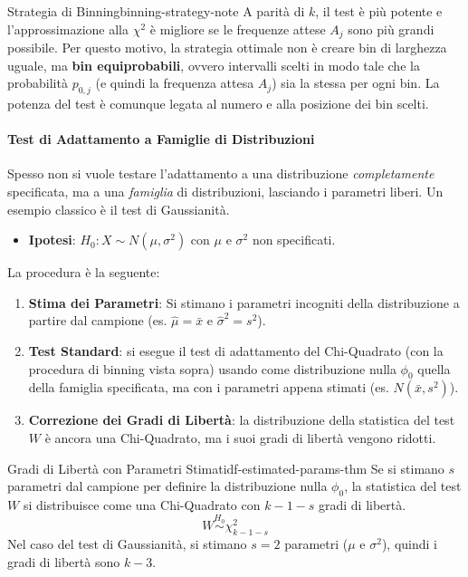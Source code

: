 \begin{nota}{Strategia di Binning}{binning-strategy-note}
A parità di \(k\), il test è più potente e l'approssimazione alla \(\chi^2\)
è migliore se le frequenze attese \(A_j\) sono più grandi possibile. Per
questo motivo, la strategia ottimale non è creare bin di larghezza uguale, ma
\textbf{bin equiprobabili}, ovvero intervalli scelti in modo tale che la
probabilità \(p_{0,j}\) (e quindi la frequenza attesa \(A_j\)) sia la stessa
per ogni bin. La potenza del test è comunque legata al numero e alla posizione
dei bin scelti.
\end{nota}

\paragraph{Test di Adattamento a Famiglie di Distribuzioni}
Spesso non si vuole testare l'adattamento a una distribuzione
\textit{completamente} specificata, ma a una \textit{famiglia} di distribuzioni,
lasciando i parametri liberi. Un esempio classico è il test di Gaussianità.
\begin{itemize}
    \item \textbf{Ipotesi}: \(H_0: X \sim N(\mu, \sigma^2)\) con \(\mu\) e
    \(\sigma^2\) non specificati.
\end{itemize}
La procedura è la seguente:
\begin{enumerate}
    \item \textbf{Stima dei Parametri}: Si stimano i parametri incogniti della
    distribuzione a partire dal campione (es. \(\hat{\mu} = \bar{x}\) e
    \(\hat{\sigma}^2 = s^2\)).
    \item \textbf{Test Standard}: si esegue il test di adattamento del
    Chi-Quadrato (con la procedura di binning vista sopra) usando come
    distribuzione nulla \(\phi_0\) quella della famiglia specificata, ma con i
    parametri appena stimati (es. \(N(\bar{x}, s^2)\)).
    \item \textbf{Correzione dei Gradi di Libertà}: la distribuzione della
    statistica del test \(W\) è ancora una Chi-Quadrato, ma i suoi gradi di
    libertà vengono ridotti.
\end{enumerate}

\begin{teorema}{Gradi di Libertà con Parametri
Stimati}{df-estimated-params-thm}
Se si stimano \(s\) parametri dal campione per definire la distribuzione nulla
\(\phi_0\), la statistica del test \(W\) si distribuisce come una Chi-Quadrato
con \(k-1-s\) gradi di libertà.
\[ W \stackrel{H_0}{\sim} \chi^2_{k-1-s} \]
Nel caso del test di Gaussianità, si stimano \(s=2\) parametri (\(\mu\) e
\(\sigma^2\)), quindi i gradi di libertà sono \(k-3\).
\end{teorema}

